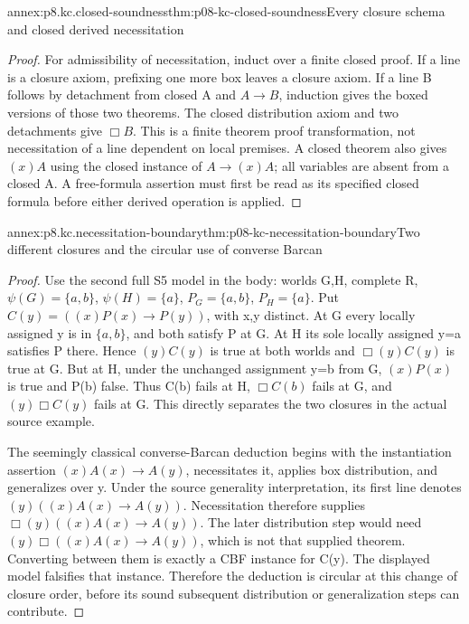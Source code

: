 \begin{annexitem}{annex:p8.kc.closed-soundness}{thm:p08-kc-closed-soundness}{Every closure schema and closed derived necessitation}
\begin{proof}
For admissibility of necessitation, induct over a finite closed
proof. If a line is a closure axiom, prefixing one more box
leaves a closure axiom. If a line B follows by detachment from
closed A and \(A\to B\), induction gives the boxed versions
of those two theorems. The closed distribution axiom and two
detachments give \(\Box B\). This is a finite theorem proof
transformation, not necessitation of a line dependent on local
premises. A closed theorem also gives \((x)A\) using the
closed instance of \(A\to(x)A\); all variables are absent
from a closed A. A free-formula assertion must first be read
as its specified closed formula before either derived operation
is applied.
\end{proof}
\end{annexitem}

\begin{annexitem}{annex:p8.kc.necessitation-boundary}{thm:p08-kc-necessitation-boundary}{Two different closures and the circular use of converse Barcan}
\begin{proof}
Use the second full S5 model in the body: worlds G,H, complete
R, \(\psi(G)=\{a,b\}\), \(\psi(H)=\{a\}\),
\(P_G=\{a,b\}\), \(P_H=\{a\}\). Put
\(C(y)=((x)P(x)\to P(y))\), with x,y distinct.
At G every locally assigned y is in \(\{a,b\}\), and both
satisfy P at G. At H its sole locally assigned y=a satisfies
P there. Hence \((y)C(y)\) is true at both worlds and
\(\Box(y)C(y)\) is true at G. But at H, under the unchanged
assignment y=b from G, \((x)P(x)\) is true and P(b) false.
Thus C(b) fails at H, \(\Box C(b)\) fails at G, and
\((y)\Box C(y)\) fails at G. This directly separates the
two closures in the actual source example.

The seemingly classical converse-Barcan deduction begins with
the instantiation assertion \((x)A(x)\to A(y)\), necessitates
it, applies box distribution, and generalizes over y. Under
the source generality interpretation, its first line denotes
\((y)((x)A(x)\to A(y))\). Necessitation therefore supplies
\(\Box(y)((x)A(x)\to A(y))\). The later distribution
step would need \((y)\Box((x)A(x)\to A(y))\), which is
not that supplied theorem. Converting between them is exactly
a CBF instance for C(y). The displayed model falsifies that
instance. Therefore the deduction is circular at this change
of closure order, before its sound subsequent distribution
or generalization steps can contribute.
\end{proof}
\end{annexitem}

